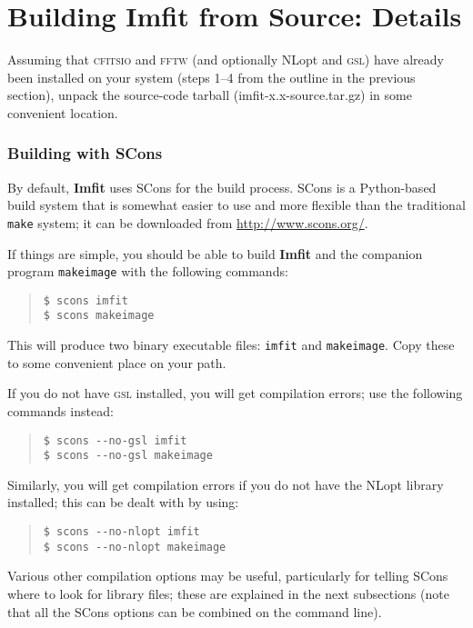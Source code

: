 \documentclass[10pt,a4paper,article]{memoir}
\newcommand{\imfit}{\textbf{Imfit}}
\newcommand{\Imfit}{\textbf{Imfit}}
\newcommand{\imfitprog}{\texttt{imfit}}
\newcommand{\makeimage}{\texttt{makeimage}}
\begin{document}
\section{Building \Imfit{} from Source: Details}\label{sec:build}

Assuming that \textsc{cfitsio} and \textsc{fftw} (and optionally NLopt
and \textsc{gsl}) have already been installed on your system (steps 1--4
from the outline in the previous section), unpack the source-code
tarball (imfit-x.x-source.tar.gz) in some convenient location.

\subsubsection{Building with SCons}

By default, \imfit{} uses SCons for the build process. SCons is a Python-based build system
that is somewhat easier to use and more flexible than the traditional \texttt{make}
system; it can be downloaded from \url{http://www.scons.org/}.

If things are simple, you should be able to build \imfit{} and the companion
program \makeimage{} with the following commands:
\begin{quote}
\texttt{\$ scons imfit} \\
\texttt{\$ scons makeimage}
\end{quote}
This will produce two binary executable files: \imfitprog{} and \makeimage{}. Copy
these to some convenient place on your path.

If you do not have \textsc{gsl} installed, you will get compilation errors; use the following
commands instead:
\begin{quote}
\verb+$ scons --no-gsl imfit+ \\
\verb+$ scons --no-gsl makeimage+
\end{quote}

Similarly, you will get compilation errors if you do not have the NLopt library installed;
this can be dealt with by using:
\begin{quote}
\verb+$ scons --no-nlopt imfit+ \\
\verb+$ scons --no-nlopt makeimage+
\end{quote}

Various other compilation options may be useful, particularly for telling SCons where
to look for library files; these are explained in the next
subsections (note that all the SCons options can be combined on the command
line).
\end{document}
